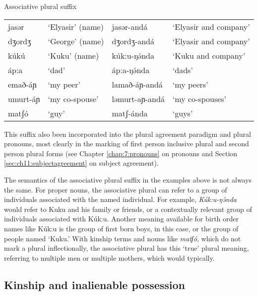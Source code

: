 \ea	 Associative plural suffix\\
\begin{tabular}[t]{llll}
jasər &  `Elyasir' (name) & jasər-andá & `Elyasir and company'\\
dʒordʒ &  `George' (name) & dʒordʒ-andá & `Elyasir and company'\\
kúkú	& 	`Kuku' (name) & kúk:u-ŋə́nda & `Kuku and company' \\ 
áp:a	& `dad'	& 	áp:a-ŋə́nda & `dads' \\
emað-áɲ & `my peer' & lamað-áɲ-andá & `my peers' \\
umurt-áɲ & `my co-spouse' & ləmurt-aɲ-andá & `my co-spouses' \\
matʃó & `guy'  & 	 matʃ-ánda & `guys'\\	
\end{tabular}
\z

This suffix also been incorporated into the plural agreement paradigm and plural pronouns, most clearly in the marking of first person inclusive plural and second person plural forms (see Chapter \ref{chap:7:pronouns} on pronouns and Section \ref{sec:ch11:subjectagreement} on subject agreement).

The semantics of the associative plural suffix in the examples above is not always the same. For proper nouns, the associative plural can refer to a group of individuals associated with the named individual. For example, \textit{Kúk:u-ŋə́nda} would refer to Kuku and his family or friends, or a contextually relevant group of individuals associated with Kúk:u. Another meaning available for birth order names like Kúk:u is the group of first born boys, in this case, or the group of people named `Kuku.' With kinship terms and nouns like \textit{matʃó}, which do not mark a plural inflectionally, the associative plural has this `true' plural meaning, referring to multiple men or multiple mothers, which would typically. 



\subsection{Kinship and inalienable possession}\label{sec:ch6:kinship}

